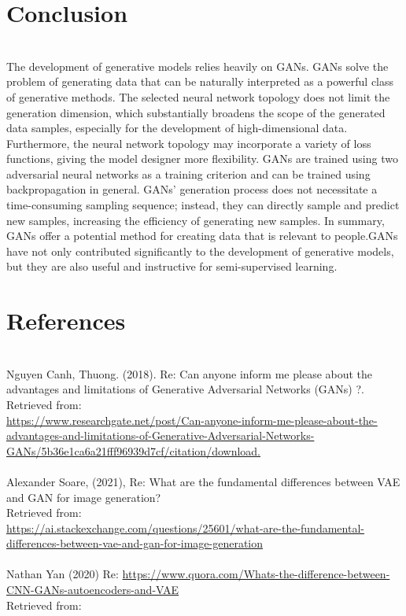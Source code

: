 \documentclass[14pt]{article}
\begin{document}
\section{Conclusion}
\\

The development of generative models relies heavily on GANs. GANs solve the problem of generating data that can be naturally interpreted as a powerful class of generative methods. The selected neural network topology does not limit the generation dimension, which substantially broadens the scope of the generated data samples, especially for the development of high-dimensional data. Furthermore, the neural network topology may incorporate a variety of loss functions, giving the model designer more flexibility. GANs are trained using two adversarial neural networks as a training criterion and can be trained using backpropagation in general. GANs' generation process does not necessitate a time-consuming sampling sequence; instead, they can directly sample and predict new samples, increasing the efficiency of generating new samples. In summary, GANs offer a potential method for creating data that is relevant to people.GANs have not only contributed significantly to the development of generative models, but they are also useful and instructive for semi-supervised learning.

\section{References}
\\
[1] Nguyen Canh, Thuong. (2018). Re: Can anyone inform me please about the advantages and limitations of Generative Adversarial Networks (GANs) ?.\\
Retrieved from:\\ \url{https://www.researchgate.net/post/Can-anyone-inform-me-please-about-the-advantages-and-limitations-of-Generative-Adversarial-Networks-GANs/5b36e1ca6a21fff96939d7cf/citation/download.} 
\\ \\ 
[2] Alexander Soare, (2021), Re: What are the fundamental differences between VAE and GAN for image generation? \\
Retrieved from: \\
\url{https://ai.stackexchange.com/questions/25601/what-are-the-fundamental-differences-between-vae-and-gan-for-image-generation}
\\
\\
[3] Nathan Yan (2020) Re: \url{https://www.quora.com/Whats-the-difference-between-CNN-GANs-autoencoders-and-VAE}\\  Retrieved from: 
\\
\end{document}

